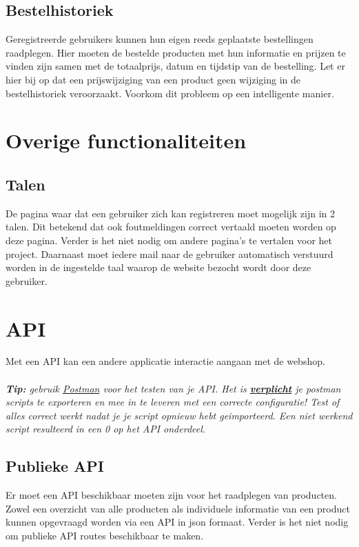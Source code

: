 \documentclass{article}
\begin{document}
\subsection{Bestelhistoriek}
Geregistreerde gebruikers kunnen hun eigen reeds geplaatste bestellingen raadplegen. Hier moeten de bestelde producten met hun informatie en prijzen te vinden zijn samen met de totaalprijs, datum en tijdstip van de bestelling. Let er hier bij op dat een prijswijziging van een product geen wijziging in de bestelhistoriek veroorzaakt. Voorkom dit probleem op een intelligente manier.


\section{Overige functionaliteiten}
\subsection{Talen}
De pagina waar dat een gebruiker zich kan registreren moet mogelijk zijn in 2 talen. Dit betekend dat ook foutmeldingen correct vertaald moeten worden op deze pagina. Verder is het niet nodig om andere pagina's te vertalen voor het project. Daarnaast moet iedere mail naar de gebruiker automatisch verstuurd worden in de ingestelde taal waarop de website bezocht wordt door deze gebruiker.

\section{API}
Met een API kan een andere applicatie interactie aangaan met de webshop. 
\\
\\
\textit{\textbf{Tip:} gebruik \href{https://www.postman.com/downloads/}{Postman} voor het testen van je API. Het is \underline{\textbf{verplicht}} je postman scripts te exporteren en mee in te leveren met een correcte configuratie! Test of alles correct werkt nadat je je script opnieuw hebt geimporteerd. Een niet werkend script resulteerd in een 0 op het API onderdeel.}

\subsection{Publieke API}
Er moet een API beschikbaar moeten zijn voor het raadplegen van producten. Zowel een overzicht van alle producten als individuele informatie van een product kunnen opgevraagd worden via een API in json formaat. Verder is het niet nodig om publieke API routes beschikbaar te maken.
\end{document}
